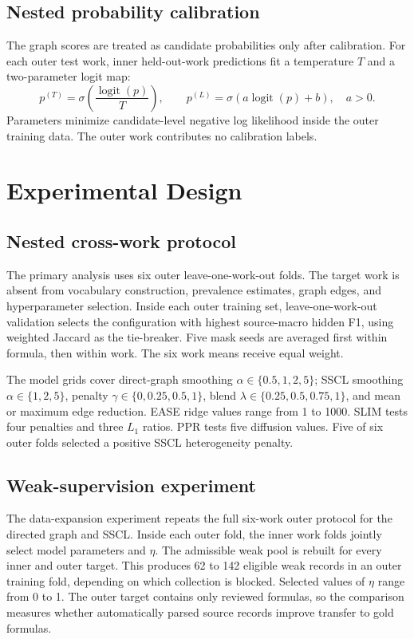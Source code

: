 \documentclass[11pt,a4paper]{article}
\newcommand{\SSCL}{\textsc{SSCL}}
\begin{document}
\subsection{Nested probability calibration}

The graph scores are treated as candidate probabilities only after calibration. For each outer test work, inner held-out-work predictions fit a temperature $T$ and a two-parameter logit map:
\begin{equation}
p^{(T)}=\sigma\!\left(\frac{\operatorname{logit}(p)}{T}\right),\qquad
p^{(L)}=\sigma\!\left(a\operatorname{logit}(p)+b\right),\quad a>0.
\label{eq:calibration}
\end{equation}
Parameters minimize candidate-level negative log likelihood inside the outer training data. The outer work contributes no calibration labels.

\section{Experimental Design}

\subsection{Nested cross-work protocol}

The primary analysis uses six outer leave-one-work-out folds. The target work is absent from vocabulary construction, prevalence estimates, graph edges, and hyperparameter selection. Inside each outer training set, leave-one-work-out validation selects the configuration with highest source-macro hidden F1, using weighted Jaccard as the tie-breaker. Five mask seeds are averaged first within formula, then within work. The six work means receive equal weight.

The model grids cover direct-graph smoothing $\alpha\in\{0.5,1,2,5\}$; \SSCL{} smoothing $\alpha\in\{1,2,5\}$, penalty $\gamma\in\{0,0.25,0.5,1\}$, blend $\lambda\in\{0.25,0.5,0.75,1\}$, and mean or maximum edge reduction. EASE ridge values range from 1 to 1000. SLIM tests four penalties and three $L_1$ ratios. PPR tests five diffusion values. Five of six outer folds selected a positive \SSCL{} heterogeneity penalty.

\subsection{Weak-supervision experiment}

The data-expansion experiment repeats the full six-work outer protocol for the directed graph and \SSCL{}. Inside each outer fold, the inner work folds jointly select model parameters and $\eta$. The admissible weak pool is rebuilt for every inner and outer target. This produces 62 to 142 eligible weak records in an outer training fold, depending on which collection is blocked. Selected values of $\eta$ range from 0 to 1. The outer target contains only reviewed formulas, so the comparison measures whether automatically parsed source records improve transfer to gold formulas.
\end{document}
